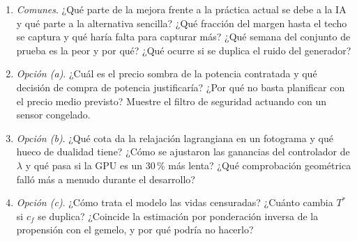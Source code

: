 \begin{enumerate}[label=\arabic*.]
  \item \emph{Comunes}. ¿Qué parte de la mejora frente a la práctica actual se debe a la IA y qué parte a la alternativa sencilla? ¿Qué fracción del margen hasta el techo se captura y qué haría falta para capturar más? ¿Qué semana del conjunto de prueba es la peor y por qué? ¿Qué ocurre si se duplica el ruido del generador?
  \item \emph{Opción (a)}. ¿Cuál es el precio sombra de la potencia contratada y qué decisión de compra de potencia justificaría? ¿Por qué no basta planificar con el precio medio previsto? Muestre el filtro de seguridad actuando con un sensor congelado.
  \item \emph{Opción (b)}. ¿Qué cota da la relajación lagrangiana en un fotograma y qué hueco de dualidad tiene? ¿Cómo se ajustaron las ganancias del controlador de $\lambda$ y qué pasa si la GPU es un 30\,\% más lenta? ¿Qué comprobación geométrica falló más a menudo durante el desarrollo?
  \item \emph{Opción (c)}. ¿Cómo trata el modelo las vidas censuradas? ¿Cuánto cambia $T^{\ast}$ si $c_f$ se duplica? ¿Coincide la estimación por ponderación inversa de la propensión con el gemelo, y por qué podría no hacerlo?
\end{enumerate}
